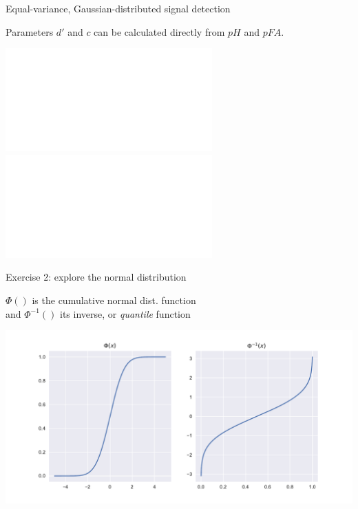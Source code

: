 \documentclass[10pt]{beamer}
\begin{document}
\begin{frame}{Equal-variance, Gaussian-distributed signal detection}

Parameters $d'$ and $c$ can be calculated directly from
$pH$ and $pFA$.\\

\begin{center}
\includegraphics<2->[scale=0.8]{figs/areas.pdf}
\includegraphics<1>[scale=0.8]{figs/areas2.pdf}
\end{center}


\end{frame}


\begin{frame}{Exercise 2: explore the normal distribution}

\end{frame}


\begin{frame}{}
$\Phi()$ is the cumulative normal dist. function\\
and $\Phi^{-1}()$ its inverse, or \textit{quantile} function


\begin{center}
\includegraphics[scale=0.5]{figs/linkfun.pdf}
\end{center}
\end{frame}
\end{document}
